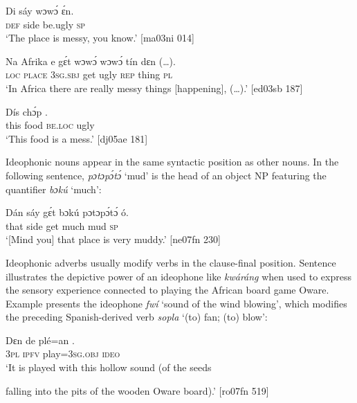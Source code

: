 \ea%
    \label{ex:key:1626}
    \gll Di  sáy  wɔwɔ́  ɛ́n.\\
\textsc{def}  side  be.ugly  \textsc{sp}\\

\glt ‘The place is messy, you know.’ [ma03ni 014]
\z


\ea%
    \label{ex:key:1627}
    \gll Na  Afrika  e    gɛ́t  wɔwɔ́  wɔwɔ́  tín    dɛn  (…).\\
\textsc{loc}  \textsc{place}  \textsc{3sg.sbj}  get  ugly    \textsc{rep}    thing  \textsc{pl}  \\

\glt ‘In Africa there are really messy things [happening], (…).’ [ed03sb 187]
\z


\ea%
    \label{ex:key:1628}
    \gll Dís  chɔ́p      .\\
this  food    \textsc{be.loc}  ugly\\

\glt ‘This food is a mess.’ [dj05ae 181]
\z

Ideophonic nouns appear in the same syntactic position as other nouns. In the following sentence, \textit{pɔtɔpɔ́tɔ́} ‘mud’ is the head of an object NP featuring the quantifier \textit{bɔkú} ‘much’:


\ea%
    \label{ex:key:1629}
    \gll Dán  sáy  gɛ́t  bɔkú  pɔtɔpɔ́tɔ́    ó.\\
that  side  get  much  mud      \textsc{sp}\\

\glt ‘[Mind you] that place is very muddy.’ [ne07fn 230]
\z

Ideophonic adverbs usually modify verbs in the clause-final position. Sentence  illustrates the depictive power of an ideophone like \textit{kwáráng} when used to express the sensory experience connected to playing the African board game Oware. Example  presents the ideophone \textit{fwí} ‘sound of the wind blowing’, which modifies the preceding Spanish-derived verb \textit{sopla} ‘(to) fan; (to) blow’: 


\ea%
    \label{ex:key:1630}
    \gll Dɛn  de  plé=an    .\\
\textsc{3pl}  \textsc{ipfv}  play=\textsc{3sg.obj}  \textsc{ideo}\\

\glt ‘It is played with this hollow sound (of the seeds 


\glt falling into the pits of the wooden Oware board).’ [ro07fn 519]
\z



